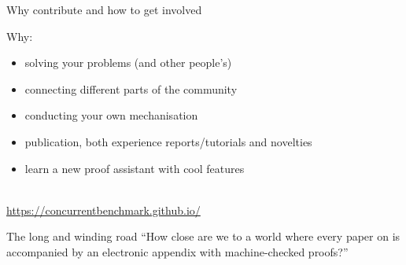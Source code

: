 \documentclass[aspectratio=169,hyperref={pdfpagelabels=false}]{beamer}
\begin{document}

\begin{frame}{Why contribute and how to get involved}

  Why:
  \begin{itemize}
  \item solving your problems (and other people's)
  \item connecting different parts of the community
  \item conducting your own mechanisation
  \item publication, both experience reports/tutorials and novelties
  \item learn a new proof assistant with cool features
  \end{itemize}

  \ \\
  {\LARGE \url{https://concurrentbenchmark.github.io/}}
  
\end{frame}

\begin{frame}{The long and winding road}
  ``How close are we to a world where every paper on  is accompanied by an electronic appendix with machine-checked proofs?''
  
\end{frame}
\end{document}
